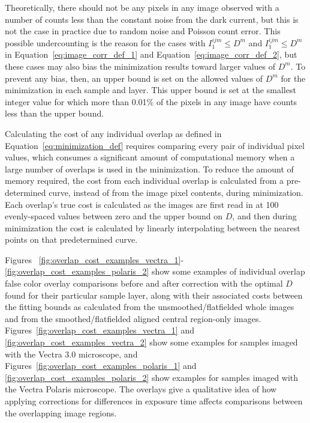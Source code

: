 \documentclass[letterpaper,11pt]{article}
\newcommand{\refeq}[1]{Equation~\ref{#1}}
\begin{document}
Theoretically, there should not be any pixels in any image observed with a number of counts less than the constant noise from the dark current, but this is not the case in practice due to random noise and Poisson count error. This possible undercounting is the reason for the cases with $I^{ijm}_{1} \leq D^{m}$ and $I^{ijm}_{1} \leq D^{m}$ in \refeq{eq:image_corr_def_1} and \refeq{eq:image_corr_def_2}, but these cases may also bias the minimization results toward larger values of $D^{m}$. To prevent any bias, then, an upper bound is set on the allowed values of $D^{m}$ for the minimization in each sample and layer. This upper bound is set at the smallest integer value for which more than 0.01\% of the pixels in any image have counts less than the upper bound.

Calculating the cost of any individual overlap as defined in \refeq{eq:minimization_def} requires comparing every pair of individual pixel values, which consumes a significant amount of computational memory when a large number of overlaps is used in the minimization. To reduce the amount of memory required, the cost from each individual overlap is calculated from a pre-determined curve, instead of from the image pixel contents, during minimization. Each overlap's true cost is calculated as the images are first read in at 100 evenly-spaced values between zero and the upper bound on $D$, and then during minimization the cost is calculated by linearly interpolating between the nearest points on that predetermined curve. 

Figures ~\ref{fig:overlap_cost_examples_vectra_1}-\ref{fig:overlap_cost_examples_polaris_2} show some examples of individual overlap false color overlay comparisons before and after correction with the optimal $D$ found for their particular sample layer, along with their associated costs between the fitting bounds as calculated from the unsmoothed/flatfielded whole images and from the smoothed/flatfielded aligned central region-only images. Figures~\ref{fig:overlap_cost_examples_vectra_1} and \ref{fig:overlap_cost_examples_vectra_2} show some examples for samples imaged with the Vectra 3.0 microscope, and Figures~\ref{fig:overlap_cost_examples_polaris_1} and \ref{fig:overlap_cost_examples_polaris_2} show examples for samples imaged with the Vectra Polaris microscope. The overlays give a qualitative idea of how applying corrections for differences in exposure time affects comparisons between the overlapping image regions.
\end{document}
